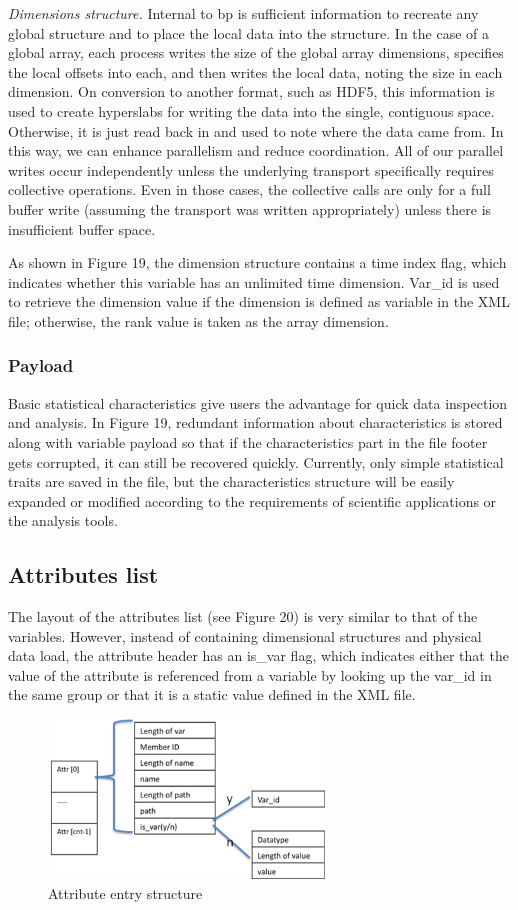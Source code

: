 \emph{Dimensions structure.} 
Internal to bp is sufficient information to recreate any global structure and to 
place the local data into the structure. In the case of a global array, each process 
writes the size of the global array dimensions, specifies the local offsets into 
each, and then writes the local data, noting the size in each dimension. On conversion 
to another format, such as HDF5, this information is used to create hyperslabs 
for writing the data into the single, contiguous space. Otherwise, it is just read 
back in and used to note where the data came from. In this way, we can enhance 
parallelism and reduce coordination. All of our parallel writes occur independently 
unless the underlying transport specifically requires collective operations. Even 
in those cases, the collective calls are only for a full buffer write (assuming 
the transport was written appropriately) unless there is insufficient buffer space. 

As shown in Figure 19, the dimension structure contains a time index flag, which 
indicates whether this variable has an unlimited time dimension. Var\_id is used 
to retrieve the dimension value if the dimension is defined as variable in the 
XML file; otherwise, the rank value is taken as the array dimension.  

\subsubsection{Payload}

Basic statistical characteristics give users the advantage for quick data inspection 
and analysis. In Figure 19, redundant information about characteristics is stored 
along with variable payload so that if the characteristics part in the file footer 
gets corrupted, it can still be recovered quickly. Currently, only simple statistical 
traits are saved in the file, but the characteristics structure will be easily 
expanded or modified according to the requirements of scientific applications or 
the analysis tools. 

\subsection{Attributes list}

The layout of the attributes list (see Figure 20) is very similar to that of the 
variables. However, instead of containing dimensional structures and physical data 
load, the attribute header has an is\_var flag, which indicates either that the 
value of the attribute is referenced from a variable by looking up the var\_id 
in the same group or that it is a static value defined in the XML file. 

\begin{figure}[htbp]
\begin{center}
\includegraphics[width=210pt, height=120pt]{ADIOS-Manual-fig033.png}
\caption{Attribute entry structure}
\end{center}
\end{figure}\label{HRef119579105}\label{HToc144350179}

